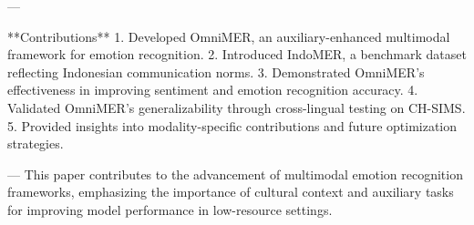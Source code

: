 ---

**Contributions**  
1. Developed OmniMER, an auxiliary-enhanced multimodal framework for emotion recognition.  
2. Introduced IndoMER, a benchmark dataset reflecting Indonesian communication norms.  
3. Demonstrated OmniMER’s effectiveness in improving sentiment and emotion recognition accuracy.  
4. Validated OmniMER’s generalizability through cross-lingual testing on CH-SIMS.  
5. Provided insights into modality-specific contributions and future optimization strategies.  

---  
This paper contributes to the advancement of multimodal emotion recognition frameworks, emphasizing the importance of cultural context and auxiliary tasks for improving model performance in low-resource settings.